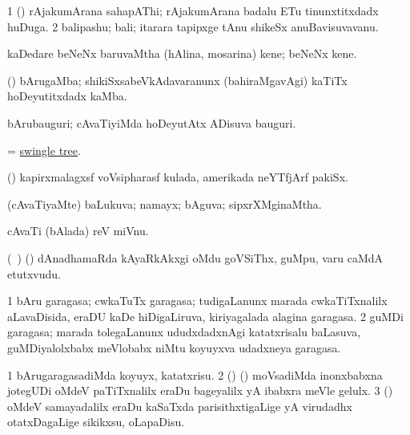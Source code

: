 \bentry
{} 
\gl{\nA}
\expl{}
\bmng
\bnum
\num{1} (\ca) rAjakumArana sahapAThi; rAjakumArana badalu ETu tinunxtitxdadx huDuga. 
\num{2} balipashu; bali; itarara tapipxge tAnu shikeSx anuBavisuvavanu. 
\enum
\emng
\eentry

\bentry
{} 
\gl{\nA}
\expl{}
\bmng
kaDedare beNeNx baruvaMtha (hAlina, mosarina) kene; beNeNx kene. 
\emng
\eentry

\bentry
{} 
\gl{\nA}
\expl{}
\bmng
(\ca) bArugaMba; shikiSxsabeVkAdavaranunx (bahiraMgavAgi) kaTiTx hoDeyutitxdadx kaMba. 
\emng
\eentry

\bentry
{} 
\gl{\nA}
\expl{}
\bmng
bArubauguri; cAvaTiyiMda hoDeyutAtx ADisuva bauguri. 
\emng
\eentry

\bentry
{} 
\gl{\nA}
\expl{}
\bmng
= \hyperref{kandict_s.pdf}{S}{swingle tree}{swingle tree}. 
\emng
\eentry

\bentry
{} 
\gl{\nA}
\expl{}
\bmng
(\ame) kapirxmalagxsf voVsipharasf kulada, amerikada neYTfjArf pakiSx. 
\emng
\eentry

\bentry
{} 
\gl{\gu}
\bmng
(cAvaTiyaMte) baLukuva; namayx; bAguva; sipxrXMginaMtha. 
\emng
\eentry

\bentry
{} 
\gl{\nA}
\expl{}
\bmng
cAvaTi (bAlada) reV miVnu. 
\emng
\eentry

\bentry
{} 
\gl{\nA}
\expl{}
\bmng
(\kanmu\ \birx) (\AmA) dAnadhamaRda kAyaRkAkxgi oMdu goVSiThx, guMpu, \mo varu caMdA etutxvudu. 
\emng
\eentry

\bentry
{} 
\gl{\nA}
\expl{}
\bmng
\bnum
\num{1} bAru garagasa; cwkaTuTx garagasa; tudigaLanunx marada cwkaTiTxnalilx aLavaDisida, eraDU kaDe hiDigaLiruva, kiriyagalada alagina garagasa. 
\num{2} guMDi garagasa; marada tolegaLanunx ududxdadxnAgi katatxrisalu baLasuva, guMDiyalolxbabx meVlobabx niMtu koyuyxva udadxneya garagasa. 
\enum
\emng
\eentry

\bentry
{} 
\gl{\kirx}


\noindent
\gl{\sakirx}
\expl{}
\bmng
\bnum
\num{1} bArugaragasadiMda koyuyx, katatxrisu. 
\num{2} (\ame) (\ashi) moVsadiMda inonxbabxna jotegUDi oMdeV paTiTxnalilx eraDu bageyalilx yA ibabxra meVle gelulx. 
\num{3} (\AmA) oMdeV samayadalilx eraDu kaSaTxda parisithxtigaLige yA virudadhx otatxDagaLige sikikxsu, oLapaDisu. 
\enum
\emng

